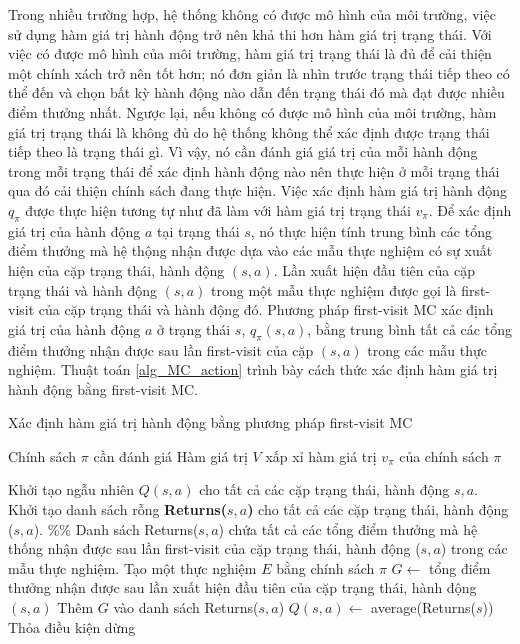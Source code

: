 Trong nhiều trường hợp, hệ thống không có được mô hình của môi trường, việc sử dụng hàm giá trị hành động trở nên khả thi hơn hàm giá trị trạng thái. Với việc có được mô hình của môi trường, hàm giá trị trạng thái là đủ để cải thiện một chính xách trở nên tốt hơn; nó đơn giản là nhìn trước trạng thái tiếp theo có thể đến và chọn bất kỳ hành động nào dẫn đến trạng thái đó mà đạt được nhiều điểm thưởng nhất. Ngược lại, nếu không có được mô hình của môi trường, hàm giá trị trạng thái là không đủ do hệ thống không thể xác định được trạng thái tiếp theo là trạng thái gì. Vì vậy, nó cần đánh giá giá trị của mỗi hành động trong mỗi trạng thái để xác định hành động nào nên thực hiện ở mỗi trạng thái qua đó cải thiện chính sách đang thực hiện.
Việc xác định hàm giá trị hành động $q_{\pi}$ được thực hiện tương tự như đã làm với hàm giá trị trạng thái $v_{\pi}$. Để xác định giá trị của hành động $a$ tại trạng thái $s$, nó thực hiện tính trung bình các tổng điểm thưởng mà hệ thộng nhận được dựa vào các mẫu thực nghiệm có sự xuất hiện của cặp trạng thái, hành động $(s,a)$. Lần xuất hiện đầu tiên của cặp trạng thái và hành động $(s,a)$ trong một mẫu thực nghiệm được gọi là first-visit của cặp trạng thái và hành động đó. Phương pháp first-visit MC xác định giá trị của hành động $a$ ở trạng thái $s$, $q_{\pi}(s,a)$, bằng trung bình tất cả các tổng điểm thưởng nhận được sau lần first-visit của cặp $(s,a)$ trong các mẫu thực nghiệm. Thuật toán \ref{alg_MC_action} trình bày cách thức xác định hàm giá trị hành động bằng first-visit MC.
\begin{algorithm}
	\caption{Xác định hàm giá trị hành động bằng phương pháp first-visit MC}
	\label{alg_MC_action}
	\begin{algorithmic}[1]
		\renewcommand{\algorithmicrequire}{\textbf{Đầu vào:}}
		\renewcommand{\algorithmicensure}{\textbf{Đầu ra:}}
		\algnewcommand{}
		\algnewcommand\Operation{\item[\algorithmicoperation]}
		
		\Require Chính sách $\pi$ cần đánh giá
		\Ensure Hàm giá trị $V$ xấp xỉ hàm giá trị $v_{\pi}$ của chính sách $\pi$
		
		\Operation
		\State Khởi tạo ngẫu nhiên $Q(s,a)$ cho tất cả các cặp trạng thái, hành động $s,a$.
		\State Khởi tạo danh sách rỗng \textbf{Returns($s,a$)} cho tất cả các cặp trạng thái, hành động ($s,a$). \%\% Danh sách Returns($s,a$) chứa tất cả các tổng điểm thưởng mà hệ thống nhận được sau lần first-visit của cặp trạng thái, hành động ($s,a$) trong các mẫu thực nghiệm.
		\Repeat
		\State Tạo một thực nghiệm $E$ bằng chính sách $\pi$
		\State $G \leftarrow$ tổng điểm thưởng nhận được sau lần xuất hiện đầu tiên của cặp trạng thái, hành động $(s,a)$
		\State Thêm $G$ vào danh sách Returns($s,a$)
		\State $Q(s,a) \leftarrow$ average(Returns($s$))
		\EndFor
		\Until Thỏa điều kiện dừng
	\end{algorithmic}
\end{algorithm}

